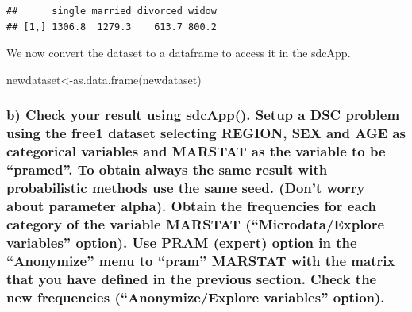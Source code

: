 \documentclass[
]{article}
\newenvironment{Shaded}{\begin{snugshade}}{\end{snugshade}}
\newcommand{\FunctionTok}[1]{\textcolor[rgb]{0.00,0.00,0.00}{#1}}
\newcommand{\NormalTok}[1]{#1}
\newcommand{\OtherTok}[1]{\textcolor[rgb]{0.56,0.35,0.01}{#1}}
\begin{document}
\begin{verbatim}
##      single married divorced widow
## [1,] 1306.8  1279.3    613.7 800.2
\end{verbatim}

We now convert the dataset to a dataframe to access it in the sdcApp.

\begin{Shaded}
\begin{Highlighting}[]
\NormalTok{newdataset}\OtherTok{\textless{}{-}}\FunctionTok{as.data.frame}\NormalTok{(newdataset)}
\end{Highlighting}
\end{Shaded}

\hypertarget{b-check-your-result-using-sdcapp.-setup-a-dsc-problem-using-the-free1-dataset-selecting-region-sex-and-age-as-categorical-variables-and-marstat-as-the-variable-to-be-pramed.-to-obtain-always-the-same-result-with-probabilistic-methods-use-the-same-seed.-dont-worry-about-parameter-alpha.-obtain-the-frequencies-for-each-category-of-the-variable-marstat-microdataexplore-variables-option.-use-pram-expert-option-in-the-anonymize-menu-to-pram-marstat-with-the-matrix-that-you-have-defined-in-the-previous-section.-check-the-new-frequencies-anonymizeexplore-variables-option.}{%
\subsubsection{b) Check your result using sdcApp(). Setup a DSC problem
using the free1 dataset selecting REGION, SEX and AGE as categorical
variables and MARSTAT as the variable to be ``pramed''. To obtain always
the same result with probabilistic methods use the same seed. (Don't
worry about parameter alpha). Obtain the frequencies for each category
of the variable MARSTAT (``Microdata/Explore variables'' option). Use
PRAM (expert) option in the ``Anonymize'' menu to ``pram'' MARSTAT with
the matrix that you have defined in the previous section. Check the new
frequencies (``Anonymize/Explore variables''
option).}\label{b-check-your-result-using-sdcapp.-setup-a-dsc-problem-using-the-free1-dataset-selecting-region-sex-and-age-as-categorical-variables-and-marstat-as-the-variable-to-be-pramed.-to-obtain-always-the-same-result-with-probabilistic-methods-use-the-same-seed.-dont-worry-about-parameter-alpha.-obtain-the-frequencies-for-each-category-of-the-variable-marstat-microdataexplore-variables-option.-use-pram-expert-option-in-the-anonymize-menu-to-pram-marstat-with-the-matrix-that-you-have-defined-in-the-previous-section.-check-the-new-frequencies-anonymizeexplore-variables-option.}}
\end{document}
